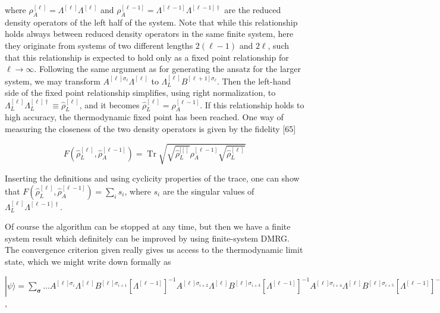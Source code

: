 \documentclass[12pt]{article}
\begin{document}
where $\rho_{A}^{[\ell]}=\Lambda^{[\ell]} \Lambda^{[\ell]}$ and $\rho_{A}^{[\ell-1]}=\Lambda^{[\ell-1]} \Lambda^{[\ell-1] \dagger}$ are the reduced density operators of the left half of the system. Note that while this relationship holds always between reduced density operators in the same finite system, here they originate from systems of two different lengths $2(\ell-1)$ and $2 \ell$, such that this relationship is expected to hold only as a fixed point relationship for $\ell \rightarrow \infty$. Following the same argument as for generating the ansatz for the larger system, we may transform $A^{[\ell] \sigma_{\ell}} \Lambda^{[\ell]}$ to $\Lambda_{L}^{[\ell]} B^{[\ell+1] \sigma_{\ell}}$. Then the left-hand side of the fixed point relationship simplifies, using right normalization, to $\Lambda_{L}^{[\ell]} \Lambda_{L}^{[\ell] \dagger} \equiv \hat{\rho}_{L}^{[\ell]}$, and it becomes $\hat{\rho}_{L}^{[\ell]}=\rho_{A}^{[\ell-1]}$. If this relationship holds to high accuracy, the thermodynamic fixed point has been reached. One way of measuring the closeness of the two density operators is given by the fidelity [65]


\begin{equation*}
F\left(\hat{\rho}_{L}^{[\ell]}, \hat{\rho}_{A}^{[\ell-1]}\right)=\operatorname{Tr} \sqrt{\sqrt{\hat{\rho}_{L}^{[[]}} \hat{\rho}_{A}^{[\ell-1]} \sqrt{\hat{\rho}_{L}^{[\ell]}}} \tag{342}
\end{equation*}


Inserting the definitions and using cyclicity properties of the trace, one can show that $F\left(\hat{\rho}_{L}^{[\ell]}, \hat{\rho}_{A}^{[\ell-1]}\right)=\sum_{i} s_{i}$, where $s_{i}$ are the singular values of $\Lambda_{L}^{[\ell]} \Lambda^{[\ell-1] \dagger}$.

Of course the algorithm can be stopped at any time, but then we have a finite system result which definitely can be improved by using finite-system DMRG. The convergence criterion given really gives us access to the thermodynamic limit state, which we might write down formally as

$|\psi\rangle=\sum_{\boldsymbol{\sigma}} \ldots A^{[\ell] \sigma_{i}} \Lambda^{[\ell]} B^{[\ell] \sigma_{i+1}}\left[\Lambda^{[\ell-1]}\right]^{-1} A^{[\ell] \sigma_{i+2}} \Lambda^{[\ell]} B^{[\ell] \sigma_{i+3}}\left[\Lambda^{[\ell-1]}\right]^{-1} A^{[\ell] \sigma_{i+4}} \Lambda^{[\ell]} B^{[\ell] \sigma_{i+5}}\left[\Lambda^{[\ell-1]}\right]^{-1} \ldots|\boldsymbol{\sigma}\rangle$,
\end{document}
